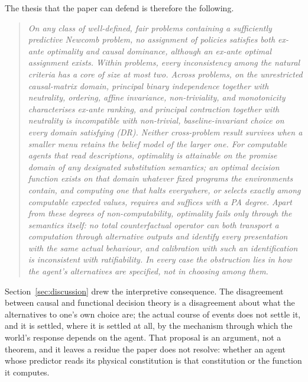 The thesis that the paper can defend is therefore the following.

\begin{quote}
\itshape
On any class of well-defined, fair problems containing a sufficiently predictive Newcomb problem, no
assignment of policies satisfies both ex-ante optimality and causal dominance, although an ex-ante
optimal assignment exists. Within problems, every inconsistency among the natural criteria has a
core of size at most two. Across problems, on the unrestricted causal-matrix domain, principal binary
independence together with neutrality, ordering, affine invariance, non-triviality, and monotonicity
characterises ex-ante ranking, and principal contraction together with neutrality is incompatible
with non-trivial, baseline-invariant choice on every domain satisfying (DR). Neither cross-problem
result survives when a smaller menu retains the belief model of the larger one. For computable agents
that read descriptions, optimality is attainable on the promise domain of any designated substitution
semantics; an optimal decision function exists on that domain whatever fixed programs the
environments contain, and computing one that halts everywhere, or selects exactly among computable
expected values, requires and suffices with a PA degree. Apart from these degrees of
non-computability, optimality fails only through the semantics itself: no total counterfactual operator can both transport a computation
through alternative outputs and identify every presentation with the same actual behaviour, and
calibration with such an identification is inconsistent with ratifiability. In every case the
obstruction lies in how the agent's alternatives are specified, not in choosing among them.
\end{quote}

Section~\ref{sec:discussion} drew the interpretive consequence. The disagreement between causal and
functional decision theory is a disagreement about what the alternatives to one's own choice are;
the actual course of events does not settle it, and it is settled, where it is settled at all, by the
mechanism through which the world's response depends on the agent. That proposal is an argument, not
a theorem, and it leaves a residue the paper does not resolve: whether an agent whose predictor reads
its physical constitution is that constitution or the function it computes.

